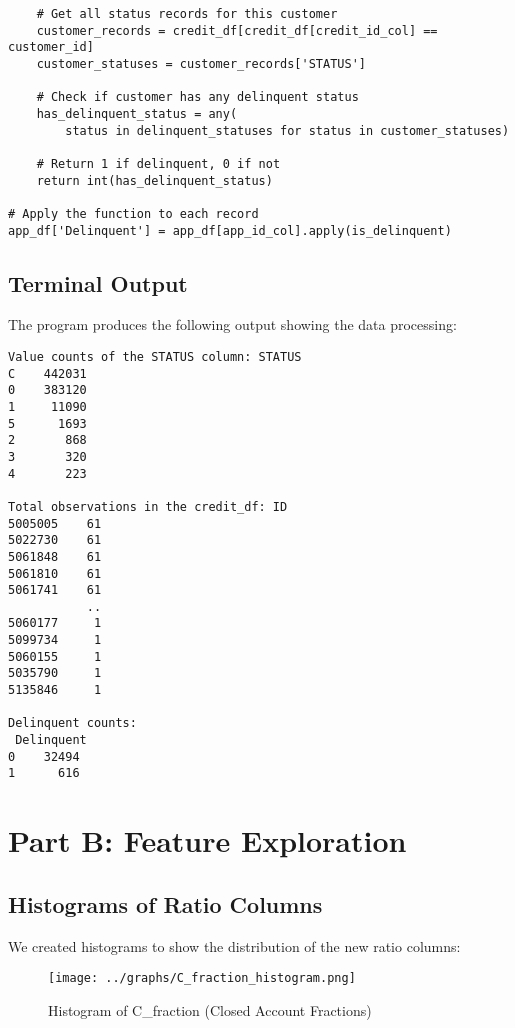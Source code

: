 \documentclass[12pt]{article}
\begin{document}
\begin{enumerate}
\begin{verbatim}
    # Get all status records for this customer
    customer_records = credit_df[credit_df[credit_id_col] == customer_id]
    customer_statuses = customer_records['STATUS']
    
    # Check if customer has any delinquent status
    has_delinquent_status = any(
        status in delinquent_statuses for status in customer_statuses)
    
    # Return 1 if delinquent, 0 if not
    return int(has_delinquent_status)

# Apply the function to each record
app_df['Delinquent'] = app_df[app_id_col].apply(is_delinquent)
\end{verbatim}

\end{enumerate}

\subsection{Terminal Output}

The program produces the following output showing the data processing:

\begin{verbatim}
Value counts of the STATUS column: STATUS
C    442031
0    383120
1     11090
5      1693
2       868
3       320
4       223

Total observations in the credit_df: ID
5005005    61
5022730    61
5061848    61
5061810    61
5061741    61
           ..
5060177     1
5099734     1
5060155     1
5035790     1
5135846     1

Delinquent counts:
 Delinquent
0    32494
1      616
\end{verbatim}

\section{Part B: Feature Exploration}

\subsection{Histograms of Ratio Columns}

We created histograms to show the distribution of the new ratio columns:

\begin{figure}[H]
    \centering
    \texttt{[image: ../graphs/C\_fraction\_histogram.png]}
    \caption{Histogram of C\_fraction (Closed Account Fractions)}
    \label{fig:c_hist}
\end{figure}
\end{document}
